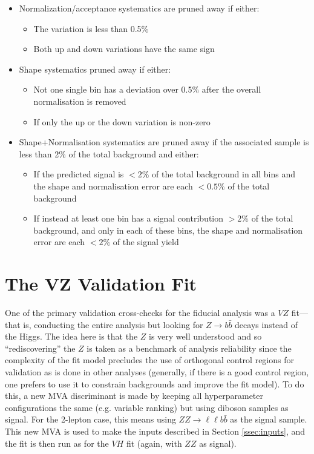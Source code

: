 \begin{enumeate}
\begin{itemize}
\item Normalization/acceptance systematics are pruned away if either:
 \begin{itemize}
  \item The variation is less than 0.5\%
  \item Both up and down variations have the same sign
 \end{itemize}

\item Shape systematics pruned away if either:
 \begin{itemize}
  \item Not one single bin has a deviation over 0.5\% after the overall normalisation is removed
  \item If only the up or the down variation is non-zero %
 \end{itemize}

\item Shape+Normalisation systematics are pruned away if the associated sample is less than 2\% of the total background and either: 
 \begin{itemize}
  \item If the predicted signal is $<2\%$ of the total background in all bins and the shape and normalisation error are each $<0.5\%$ of the total background
  \item If instead at least one bin has a signal contribution $>2\%$ of the total background, and only in each of these bins, the shape and normalisation error are each $<2\%$ of the signal yield
 \end{itemize}
\end{itemize}


\section{The VZ Validation Fit}
One of the primary validation cross-checks for the fiducial analysis was a $VZ$ fit---that is, conducting the entire analysis but looking for $Z\to b\bar{b}$ decays instead of the Higgs.  The idea here is that the $Z$ is very well understood and so ``rediscovering'' the $Z$ is taken as a benchmark of analysis reliability since the complexity of the fit model precludes the use of orthogonal control regions for validation as is done in other analyses (generally, if there is a good control region, one prefers to use it to constrain backgrounds and improve the fit model).  To do this, a new MVA discriminant is made by keeping all hyperparameter configurations the same (e.g. variable ranking) but using diboson samples as signal.  For the 2-lepton case, this means using $ZZ\to\ell\ell b\bar{b}$ as the signal sample.  This new MVA is used to make the inputs described in Section \ref{ssec:inputs}, and the fit is then run as for the $VH$ fit (again, with $ZZ$ as signal).


\end{enumeate}
